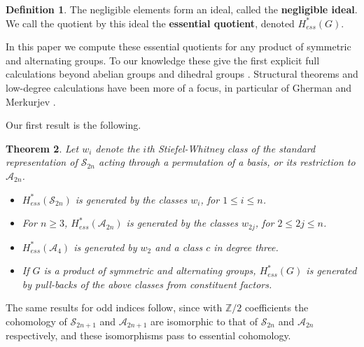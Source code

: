\documentclass{article}
\theoremstyle{plain}
\newtheorem{theorem}{Theorem}
\theoremstyle{definition}
\newtheorem{definition}[theorem]{Definition}
\newcommand{\Z}{\mathbb{Z}}
\newcommand{\si}{\mathcal{S}}
\newcommand{\alt}{\mathcal{A}}
\begin{document}
\begin{definition}
    The negligible elements form an ideal, called the {\bf negligible ideal}. We call the quotient by 
this ideal the {\bf essential quotient}, denoted $H_{ess}^*(G)$.
\end{definition}      


In this paper  we compute
these essential quotients for any product of symmetric and alternating groups.  To our knowledge these give
the first explicit full calculations beyond abelian groups \cite{B-FS94, GM24} and dihedral
groups \cite{Gherman23}. Structural theorems and low-degree calculations have been more of a focus, in particular of  Gherman and Merkurjev \cite{GM22, GM24}.

Our first  result is the following.  

\begin{theorem}\label{main}
Let $w_i$ denote the $i$th Stiefel-Whitney class of the standard
representation of $\si_{2n}$ acting through a permutation
of a basis, or its restriction to $\alt_{2n}$.
    \begin{itemize}
        \item $H^*_{ess}(\si_{2n})$ is generated by the classes $w_{i}$,  for $1 \leq i \leq n$.
        \item For $n \geq 3$, $H^*_{ess}(\alt_{2n} )$ is generated by the classes $w_{2j}$,  for $2 \leq 2j \leq n$.
        \item $H^*_{ess}(\alt_4 )$ is generated by $w_2$ and a class $c$ in degree three.

        \item If $G$ is a product of symmetric and alternating groups, 
        $H^*_{ess}(G)$ is generated by pull-backs of the above
        classes from constituent factors.
    \end{itemize}
\end{theorem}

The same results for odd indices follow, since with $\Z/2$ coefficients the cohomology
of $\si_{2n+1}$ and $\alt_{2n+1}$ are isomorphic to that of
$\si_{2n}$ and $\alt_{2n}$ respectively, and these isomorphisms
pass to essential cohomology.
\end{document}

